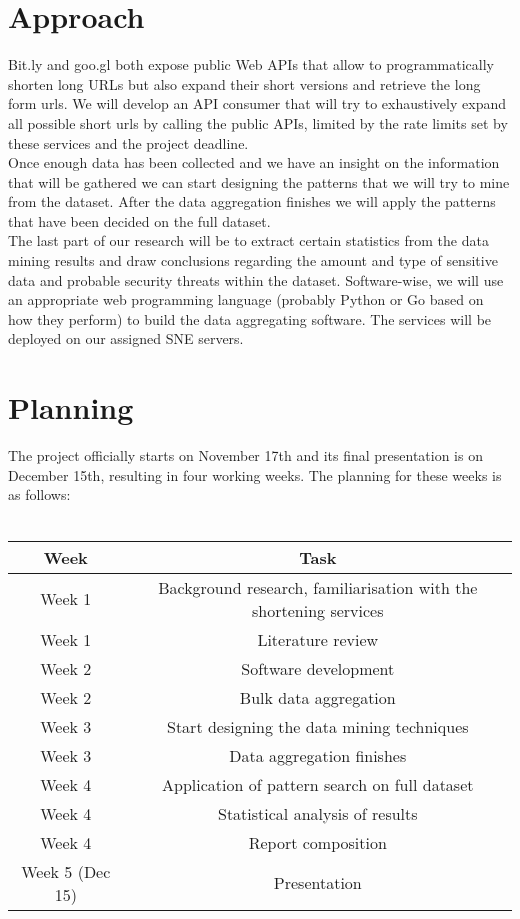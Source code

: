 \documentclass{article}
\begin{document}
\section{Approach}
Bit.ly and goo.gl both expose public Web APIs that allow to programmatically shorten long URLs but also expand their short versions and retrieve the long form urls.\cite{bitlyapi}\cite{googleapi} We will develop an API consumer that will try to exhaustively expand all possible short urls by calling the public APIs, limited by the rate limits set by these services and the project deadline. \\
Once enough data has been collected and we have an insight on the information that will be gathered we can start designing the patterns that we will try to mine from the dataset. After the data aggregation finishes we will apply the patterns that have been decided on the full dataset.\\
The last part of our research will be to extract certain statistics from the data mining results and draw conclusions regarding the amount and type of sensitive data and probable security threats within the dataset. 
Software-wise, we will use an appropriate web programming language (probably Python or Go based on how they perform) to build the data aggregating software. The services will be deployed on our assigned SNE servers.\\
\newpage
\section{Planning}
The project officially starts on November 17th and its final presentation is on December 15th, resulting in four working weeks. The planning for these weeks is as follows:
\\\\
\begin{table}[h]
  \begin{tabular}{|c|c|}
    \hline
    Week  & Task \\
    \hline
    Week 1 & Background research, familiarisation with the shortening services \\
    \hline
    Week 1 & Literature review   \\
    \hline
    Week 2 & Software development \\
    \hline
    Week 2  & Bulk data aggregation \\
    \hline
    Week 3 & Start designing the data mining techniques\\
    \hline
    Week 3 & Data aggregation finishes\\
    \hline
    Week 4 & Application of pattern search on full dataset \\
    \hline
    Week 4  & Statistical analysis of results \\
    \hline
    Week 4  & Report composition  \\
    \hline
    Week 5 (Dec 15) & Presentation \\
    \hline
  \end{tabular}
\end{table}\\
\end{document}
